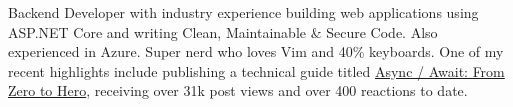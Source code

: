 

\begin{cvparagraph}

Backend Developer with industry experience building web applications using ASP.NET Core and writing Clean, Maintainable \& Secure Code. Also experienced in Azure. Super nerd who loves Vim and 40\% keyboards.
\newline
\newline
One of my recent highlights include publishing a technical guide titled \href{https://dev.to/zhiyuanamos/async-await-from-zero-to-hero-a22}{Async / Await: From Zero to Hero}, receiving over 31k post views and over 400 reactions to date.
\end{cvparagraph}